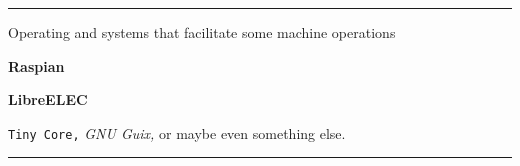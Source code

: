 
\hrule
\vskip 2in
\centerline{Operating and systems that facilitate some machine operations}
\vskip17pt
\centerline{\bf Raspian}
\vskip         8.5pt
\centerline{\bf LibreELEC}
\vskip17pt
{\tt Tiny Core,} %
{\it GNU Guix,}
or maybe even something else.
\vskip72pt
\hrule
\vfill\eject
